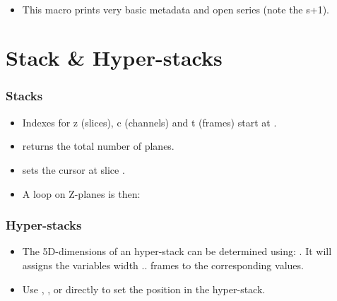 \begin{frame}
  \begin{example}~\par
    \begin{itemize}
    \item This macro prints very basic metadata and open series (note the s+1).
      
    \end{itemize}
  \end{example}
\end{frame}

\section{Stack \& Hyper-stacks}
\begin{frame}[fragile]
  \frametitle<presentation>{Stacks}
  \begin{itemize}
  \item Indexes for z (slices), c (channels) and t (frames) start at .
  \item {} returns the total number of planes.
  \item {} sets the cursor at slice .
  \item A loop on Z-planes is then:\par
    
  \end{itemize}
\end{frame}

\begin{frame}
  \frametitle<presentation>{Hyper-stacks}
  \begin{itemize}
  \item The 5D-dimensions of an hyper-stack can be determined using:
    . It
    will assigns the variables width .. frames to the corresponding
    values.
  \item Use , ,
     or directly
     to set the position in the
    hyper-stack.
  \end{itemize}
\end{frame}

